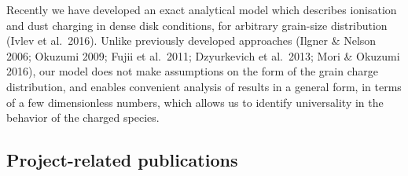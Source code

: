 \documentclass[10pt,fleqn,twoside]{article}
\begin{document}
Recently we have developed an exact analytical model which describes ionisation and dust charging in dense disk conditions,
for arbitrary grain-size distribution (Ivlev et al.\ 2016). Unlike previously developed approaches (Ilgner \& Nelson 2006; Okuzumi 2009; Fujii et al.\ 2011; Dzyurkevich et al.\ 2013; Mori \& Okuzumi 2016), our model does not make assumptions on the form of the grain charge distribution, and enables convenient analysis of results in a general form, in terms of a few dimensionless numbers, which allows us to identify universality in the behavior of the charged species.


\subsection{Project-related publications}
%
%
\end{document}
